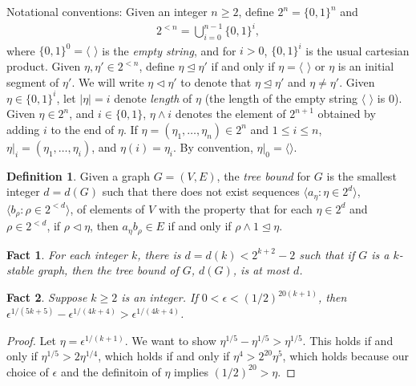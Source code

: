 \documentclass[11pt]{article}
\newtheorem{fact}{Fact}
\theoremstyle{definition}
\newtheorem{definition}{Definition}
\begin{document}
Notational conventions: Given an integer $n\geq 2$, define $2^n=\{0,1\}^n$ and
\begin{align*}
2^{<n}=\bigcup_{i=0}^{n-1} \{0,1\}^i,
\end{align*}
where $\{0,1\}^0=\langle$ $\rangle$ is the \emph{empty string}, and for $i>0$, $\{0,1\}^i$ is the usual cartesian product.  Given $\eta, \eta'\in 2^{<n}$, define $\eta \trianglelefteq \eta'$ if and only if $\eta=\langle$ $\rangle$ or $\eta$ is an initial segment of $\eta'$.  We will write $\eta \triangleleft \eta'$ to denote that $\eta \trianglelefteq \eta'$ and $\eta \neq \eta'$.  Given $\eta \in \{0,1\}^i$, let $|\eta|=i$ denote \emph{length} of $\eta$ (the length of the empty string $\langle$ $\rangle$ is $0$). Given $\eta \in 2^n$, and $i\in \{0,1\}$, $\eta\wedge i$ denotes the element of $2^{n+1}$ obtained by adding $i$ to the end of $\eta$.  If $\eta=(\eta_1,\ldots, \eta_n) \in 2^n$ and $1\leq i\leq n$, $\eta |_i=(\eta_1,\ldots, \eta_i)$, and $\eta(i)=\eta_i$.  By convention, $\eta|_0=\langle \rangle$.  


\begin{definition}
Given a graph $G=(V,E)$, the \emph{tree bound} for $G$ is the smallest integer $d=d(G)$ such that there does not exist sequences $\langle a_{\eta}: \eta \in 2^d\rangle$, $\langle b_{\rho}: \rho \in 2^{<d}\rangle$, of elements of $V$ with the property that for each $\eta\in 2^d$ and $\rho\in 2^{<d}$, if $\rho \triangleleft \eta$, then $a_{\eta}b_{\rho}\in E$ if and only if $\rho\wedge 1\trianglelefteq \eta$.
\end{definition}

\begin{fact}\cite{hodges}\label{treefact}
For each integer $k$, there is $d=d(k)<2^{k+2}-2$ such that if $G$ is a $k$-stable graph, then the tree bound of $G$, $d(G)$, is at most $d$.
\end{fact}

\begin{fact}\label{fact00}
Suppose $k\geq 2$ is an integer.  If $0<\epsilon<(1/2)^{20(k+1)}$, then $\epsilon^{1/(5k+5)}-\epsilon^{1/(4k+4)}> \epsilon^{1/(4k+4)}$.
\end{fact}
\begin{proof}
Let $\eta=\epsilon^{1/(k+1)}$.  We want to show $\eta^{1/5}-\eta^{1/5}>\eta^{1/5}$.  This holds if and only if $\eta^{1/5}>2\eta^{1/4}$, which holds if and only if $\eta^4>2^{20}\eta^5$, which holds because our choice of $\epsilon$ and the definitoin of $\eta$ implies $(1/2)^{20}>\eta$.
\end{proof}
\end{document}
